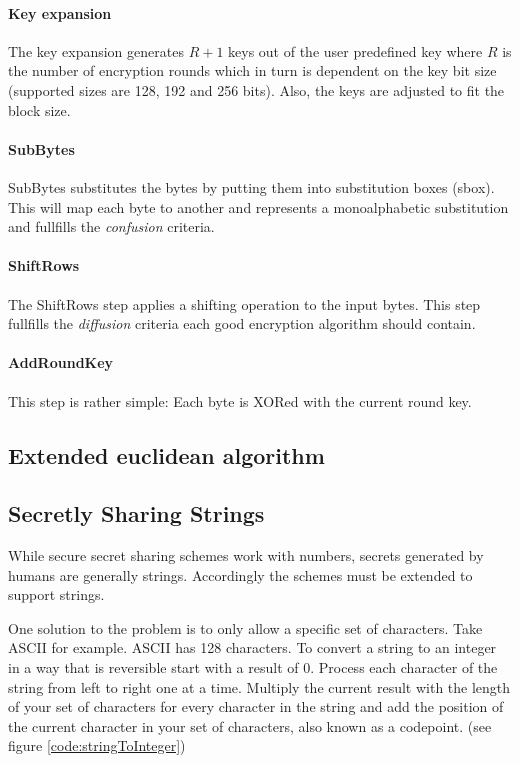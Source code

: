 \paragraph{Key expansion}
The key expansion generates $R + 1$ keys out of the user predefined key where
$R$ is the number of encryption rounds which in turn is dependent on the key 
bit size (supported sizes are 128, 192 and 256 bits). Also,
the keys are adjusted to fit the block size.

\paragraph{SubBytes}
SubBytes substitutes the bytes by putting them into substitution boxes (sbox).
This will map each byte to another and represents a monoalphabetic substitution
and fullfills the \textit{confusion} criteria.

\paragraph{ShiftRows}
The ShiftRows step applies a shifting operation to the input bytes. This step
fullfills the \textit{diffusion} criteria each good encryption algorithm should
contain.

\paragraph{AddRoundKey}
This step is rather simple: Each byte is XORed with the current round key.

\subsection{Extended euclidean algorithm}

\subsection{Secretly Sharing Strings}

While secure secret sharing schemes work with numbers, secrets generated by
humans are generally strings. Accordingly the schemes must be extended to
support strings.

One solution to the problem is to only allow a specific set of characters. Take
ASCII for example. ASCII has 128 characters. To convert a string to an integer
in a way that is reversible start with a result of 0. Process each character of
the string from left to right one at a time. Multiply the current result with
the length of your set of characters for every character in the string and add
the position of the current character in your set of characters, also known as
a codepoint. (see figure \ref{code:stringToInteger})

